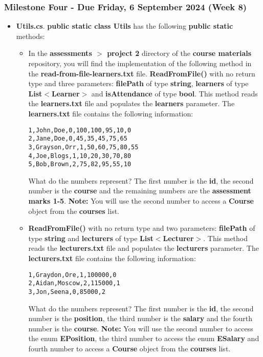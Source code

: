 \documentclass{article}
\begin{document}
\subsubsection*{Milestone Four - Due Friday, 6 September 2024 (Week 8)}

\begin{itemize}
    \item \textbf{Utils.cs}. \textbf{public static class Utils} has the following \textbf{public static} methods:
        \begin{itemize}
            \item In the \textbf{assessments $>$ project 2} directory of the \textbf{course materials} repository, you will find the implementation of the following method in the \textbf{read-from-file-learners.txt} file.
            \textbf{ReadFromFile()} with no return type and three parameters: \textbf{filePath} of type \textbf{string}, \textbf{learners} of type \textbf{List$<$Learner$>$} and \textbf{isAttendance} of type \textbf{bool}. This method reads the \textbf{learners.txt} file and populates the \textbf{learners} parameter. The \textbf{learners.txt} file contains the following information:\\
            \begin{verbatim}
1,John,Doe,0,100,100,95,10,0
2,Jane,Doe,0,45,35,45,75,65
3,Grayson,Orr,1,50,60,75,80,55
4,Joe,Blogs,1,10,20,30,70,80
5,Bob,Brown,2,75,82,95,55,10
            \end{verbatim}
            What do the numbers represent? The first number is the \textbf{id}, the second number is the \textbf{course} and the remaining numbers are the \textbf{assessment marks 1-5}. \textbf{Note:} You will use the second number to access a \textbf{Course} object from the \textbf{courses} list.
        \item \textbf{ReadFromFile()} with no return type and two parameters: \textbf{filePath} of type \textbf{string} and \textbf{lecturers} of type \textbf{List$<$Lecturer$>$}. This method reads the \textbf{lecturers.txt} file and populates the \textbf{lecturers} parameter. The \textbf{lecturers.txt} file contains the following information:\\
        \begin{verbatim}
1,Graydon,Ore,1,100000,0
2,Aidan,Moscow,2,115000,1
3,Jon,Seena,0,85000,2
        \end{verbatim}
        What do the numbers represent? The first number is the \textbf{id}, the second number is the \textbf{position}, the third number is the \textbf{salary} and the fourth number is the \textbf{course}. \textbf{Note:} You will use the second number to access the enum \textbf{EPosition}, the third number to access the enum \textbf{ESalary} and fourth number to access a \textbf{Course} object from the \textbf{courses} list.
    \end{itemize}
\end{itemize}
\end{document}
